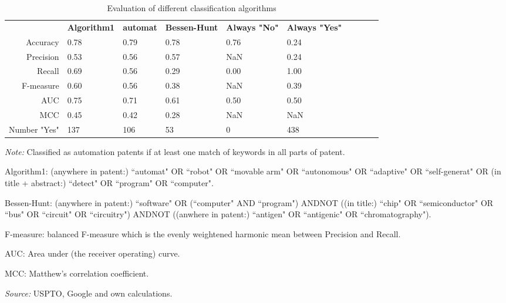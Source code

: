 \begin{table}
\begin{small}
\begin{threeparttable}
\caption{{\normalsize Evaluation of different classification algorithms}}
\label{table:table_compare_classalg}
\begin{tabular}{rlllllllll}
\toprule 
 & \textbf{Algorithm1} & \textbf{automat} & \textbf{Bessen-Hunt} & \textbf{Always "No"} & \textbf{Always "Yes"}  \tabularnewline 
Accuracy & 0.78 & 0.79 & 0.78 & 0.76 & 0.24 & & & &  \tabularnewline 
Precision & 0.53 & 0.56 & 0.57 & NaN & 0.24 & & & &  \tabularnewline 
Recall & 0.69 & 0.56 & 0.29 & 0.00 & 1.00 & & & &  \tabularnewline 
F-measure & 0.60 & 0.56 & 0.38 & NaN & 0.39 & & & &  \tabularnewline 
AUC & 0.75 & 0.71 & 0.61 & 0.50 & 0.50 & & & &  \tabularnewline 
MCC & 0.45 & 0.42 & 0.28 & NaN & NaN & & & &  \tabularnewline 
Number "Yes" & 137 & 106 & 53 & 0 & 438 & & & &  \tabularnewline 
\bottomrule 
\end{tabular} 
\begin{tablenotes}
\small
\item\textit{Note:} Classified as automation patents if at least one match of keywords in all parts of patent. \item Algorithm1: (anywhere in patent:) ``automat" OR ``robot" OR ``movable arm" OR ``autonomous" OR  ``adaptive" OR ``self-generat" OR (in title + abstract:) ``detect" OR ``program" OR ``computer".
\item Bessen-Hunt: (anywhere in patent:) ``software" OR (``computer" AND ``program") ANDNOT ((in title:) ``chip" OR ``semiconductor" OR ``bus" OR ``circuit" OR ``circuitry") ANDNOT ((anwhere in patent:) ``antigen" OR ``antigenic" OR ``chromatography").
\item F-measure: balanced F-measure which is the evenly weightened harmonic mean between Precision and Recall. 
\item AUC: Area under (the receiver operating) curve.
\item MCC: Matthew's correlation coefficient.
\item\textit{Source:} USPTO, Google and own calculations.
\end{tablenotes}
\end{threeparttable}
\end{small}
\end{table}
